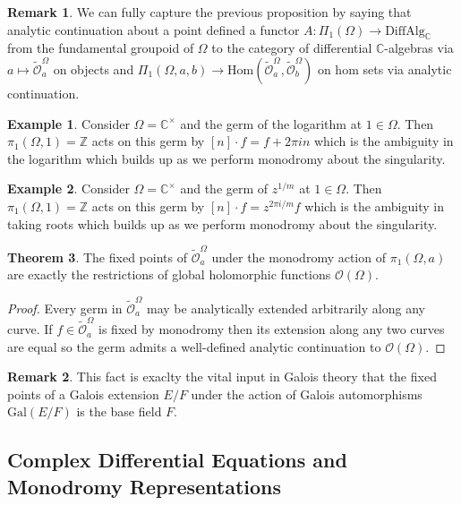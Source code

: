 \documentclass[12pt]{extarticle}
\newcommand{\Z}{\mathbb{Z}}
\newcommand{\C}{\mathbb{C}}
\theoremstyle{definition}
\newtheorem{theorem}{Theorem}[section]
\newtheorem{example}[theorem]{Example}
\newtheorem{remark}{Remark}
\renewcommand{\O}{\mathcal{O}}
\begin{document}
\begin{remark}
We can fully capture the previous proposition by saying that analytic continuation about a point defined a functor $A : \Pi_1(\Omega) \to \mathrm{DiffAlg}_\C$ from the fundamental groupoid of $\Omega$ to the category of differential $\C$-algebras via $a \mapsto \tilde{\O}_a^\Omega$ on objects and $\Pi_1(\Omega, a, b) \to \text{Hom}(\tilde{\O}_a^\Omega, \tilde{\O}_b^\Omega)$ on hom sets via analytic continuation. 
\end{remark}

\begin{example}
Consider $\Omega = \C^\times$ and the germ of the logarithm at $1 \in \Omega$. Then $\pi_1(\Omega, 1) = \Z$ acts on this germ by $[n] \cdot f = f + 2 \pi i n$ which is the ambiguity in the logarithm which builds up as we perform monodromy about the singularity.
\end{example}

\begin{example}
Consider $\Omega = \C^\times$ and the germ of $z^{1/m}$ at $1 \in \Omega$. Then $\pi_1(\Omega, 1) = \Z$ acts on this germ by $[n] \cdot f = z^{2 \pi i/m} f$ which is the ambiguity in taking roots which builds up as we perform monodromy about the singularity.
\end{example}

\begin{theorem}
The fixed points of $\tilde{\O}_a^\Omega$ under the monodromy action of $\pi_1(\Omega, a)$ are exactly the restrictions of global holomorphic functions $\O(\Omega)$. 
\end{theorem}

\begin{proof}
Every germ in $\tilde{\O}_a^\Omega$ may be analytically extended arbitrarily along any curve. If $f \in \tilde{\O}_a^\Omega$ is fixed by monodromy then its extension along any two curves are equal so the germ admits a well-defined analytic continuation to $\O(\Omega)$. 
\end{proof}

\begin{remark}
This fact is exaclty the vital input in Galois theory that the fixed points of a Galois extension $E / F$ under the action of Galois automorphisms $\mathrm{Gal}(E/F)$ is the base field $F$. 
\end{remark}

\subsection{Complex Differential Equations and Monodromy Representations} 
\end{document}
